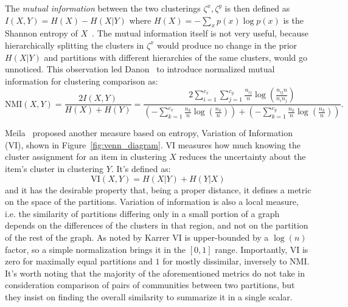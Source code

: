 The \emph{mutual information} between the two clusterings $\zeta^x,\zeta^y$ is then defined as $I(X,Y)=H(X) - H(X|Y)$ where $H(X)=-\sum_x p(x) \log p(x)$ is the Shannon entropy of $X$~\cite{cover2006}.
The mutual information itself is not very useful, because hierarchically splitting the clusters in $\zeta^x$ would produce no change in the prior $H(X|Y)$ and partitions with different hierarchies of the same clusters, would go unnoticed.
This observation led Danon~\cite{danon2005} to introduce normalized mutual information for clustering comparison as: 
\begin{equation}\label{eq:nmi}
\textrm{NMI}(X,Y) = \frac{2I(X,Y)}{H(X)+H(Y)} = \dfrac{2\sum \limits_{i=1}^{c_x} \sum \limits_{j=1}^{c_y} \frac{n_{ij}}{n} \log\left( \frac{n_{ij}n}{n_i n_j} \right)} {\left(-\sum \limits_{k=1}^{c_x} \frac{n_k}{n}\log\left(\frac{n_k}{n}\right) \right) + \left(-\sum \limits_{k=1}^{c_y} \frac{n_k}{n}\log\left(\frac{n_k}{n}\right) \right)}.
\end{equation}

Meila~\cite{meila2007} proposed another measure based on entropy, Variation of Information (VI), shown in Figure~\ref{fig:venn_diagram}.
VI measures how much knowing the cluster assignment for an item in clustering $X$ reduces the uncertainty about the item's cluster in clustering $Y$.
It's defined as:
\begin{equation}\label{eq:vi}
\textrm{VI}(X,Y) = H(X|Y) + H(Y|X)
\end{equation}
and it has the desirable property that, being a proper distance, it defines a metric on the space of the partitions.
Variation of information is also a local measure, i.e. the similarity of partitions differing only in a small portion of a graph depends on the differences of the clusters in that region, and not on the partition of the rest of the graph.
As noted by Karrer \cite{karrer2008} VI is upper-bounded by a $\log(n)$ factor, so a simple normalization brings it in the $[0,1]$ range.
Importantly, VI is zero for maximally equal partitions and $1$ for mostly dissimilar, inversely to NMI.
It's worth noting that the majority of the aforementioned metrics do not take in consideration comparison of pairs of communities between two partitions, but they insist on finding the overall similarity to summarize it in a single scalar.

